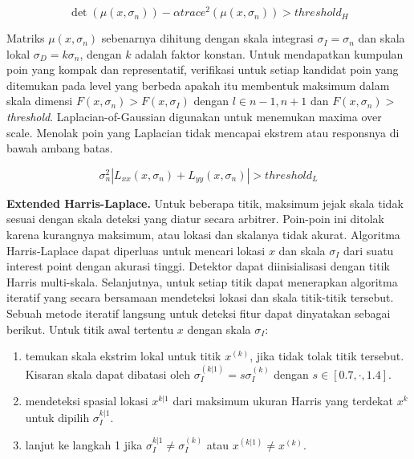 \begin{equation}
  \det(\mu(x,\sigma_{n}))-\alpha trace^{2}(\mu(x,\sigma_{n})) > threshold_{H}
\end{equation}

Matriks \(\mu(x,\sigma_{n})\) sebenarnya dihitung dengan skala integrasi \(\sigma_{I} = \sigma_{n}\) dan skala lokal \(\sigma_{D} = k \sigma_{n}\), dengan \(k\) adalah faktor konstan. Untuk mendapatkan kumpulan poin yang kompak dan representatif, verifikasi untuk setiap kandidat poin yang ditemukan pada level yang berbeda apakah itu membentuk maksimum dalam skala dimensi \(F(x,\sigma_{n}) > F(x,\sigma_{I})\) dengan \(l \in  {n-1,n+1}\) dan \(F(x,\sigma_{n}) >\) \emph{threshold}. Laplacian-of-Gaussian digunakan untuk menemukan maxima over scale. Menolak poin yang Laplacian tidak mencapai ekstrem atau responsnya di bawah ambang batas.

\begin{equation}
  \sigma^{2}_{n}| L_{xx}(x,\sigma_{n}) + L_{yy}(x, \sigma_{n})| > threshold_{L}
\end{equation}

\textbf{Extended Harris-Laplace.} Untuk beberapa titik, maksimum jejak skala tidak sesuai dengan skala deteksi yang diatur secara arbitrer. Poin-poin ini ditolak karena kurangnya maksimum, atau lokasi dan skalanya tidak akurat. Algoritma Harris-Laplace dapat diperluas untuk mencari lokasi \(x\) dan skala \(\sigma_{I}\) dari suatu interest point dengan akurasi tinggi. Detektor dapat diinisialisasi dengan titik Harris multi-skala. Selanjutnya, untuk setiap titik dapat menerapkan algoritma iteratif yang secara bersamaan mendeteksi lokasi dan skala titik-titik tersebut. Sebuah metode iteratif langsung untuk deteksi fitur dapat dinyatakan sebagai berikut. Untuk titik awal tertentu \(x\) dengan skala \(\sigma_{I}\):

\begin{enumerate}
  \setlength{\parskip}{0pt}
	\item temukan skala ekstrim lokal untuk titik \(x^{(k)}\), jika tidak tolak titik tersebut. Kisaran skala dapat dibatasi oleh \(\sigma^{(k|1)}_{I} = s\sigma_{I}^{(k)}\) dengan \(s \in [0.7 , \cdot , 1.4]\).
	\item mendeteksi spasial lokasi \(x^{k|1}\) dari maksimum ukuran Harris yang terdekat \(x^{k}\) untuk dipilih \(\sigma^{k|1}_{I}\).
	\item lanjut ke langkah 1 jika \(\sigma^{k|1}_{I} \neq \sigma^{(k)}_{I}\) atau \(x^{(k|1)} \neq x^{(k)}\).
\end{enumerate}

